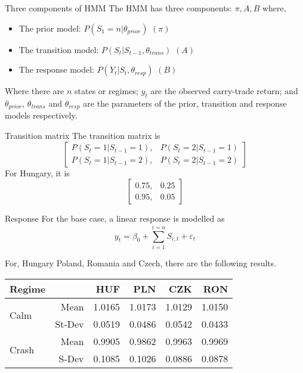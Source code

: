 \documentclass[14pt,xcolor=pdftex,dvipsnames,table]{beamer}
\begin{document}
\begin{frame}{Three components of HMM}
The HMM has three components: $\pi, A, B$ where,
\begin{itemize}[<+-| alert@+>]
\item The prior model: $P(S_1 = n| \theta_{prior})$ $(\pi)$
\item The transition model: $P(S_t| S_{t-1}, \theta_{trans})$ $(A)$
\item The response model: $P(Y_t| S_t, \theta_{resp})$ $(B)$
\end{itemize}
\pause
Where there are $n$ states or regimes; $y_t$ are the observed carry-trade return; and $\theta_{prior}$, $\theta_{trans}$ and  $\theta_{resp}$ are the parameters of the prior, transition and response models respectively.
\end{frame}

\begin{frame}{Transition matrix}
The transition matrix is
\begin{equation*}
\begin{bmatrix}
P(S_t = 1|S_{t-1}=1),  & P(S_t = 2|S_{t-1}=1)\\
P(S_t = 1|S_{t-1}=2),  & P(S_t = 2|S_{t-1}=2)
\end{bmatrix}
\end{equation*}
For Hungary, it is 
\begin{equation*}
\begin{bmatrix}
0.75,  & 0.25\\
0.95,  & 0.05
\end{bmatrix}
\end{equation*}
\end{frame}

\begin{frame}{Response}
For the base case, a linear response is modelled as
\begin{equation*}
y_t = \beta_0 + \sum_{i=1}^{i=n}S_{i,t} + \varepsilon_t
\end{equation*}

For, Hungary Poland, Romania and Czech, there are the following results. 
\begin{center}
 \begin{tabular}{lrrrrr}
  \hline
 Regime& & HUF & PLN & CZK & RON \\ 
  \hline
   \multirow{2}{*}[5pt]{Calm}& Mean & 1.0165 & 1.0173 & 1.0129 & 1.0150 \\ 
&St-Dev& 0.0519 & 0.0486 & 0.0542 & 0.0433  \\ 
\hline
\multirow{2}{*}[5pt]{Crash}& Mean & 0.9905 & 0.9862 & 0.9963 & 0.9969  \\ 
 &S-Dev & 0.1085 & 0.1026 & 0.0886 & 0.0878 
\end{tabular}
\end{center}
\end{frame}
\end{document}
